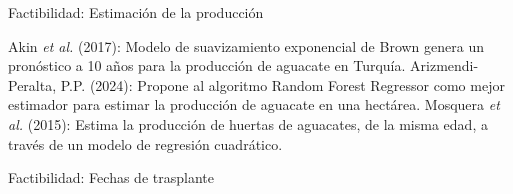 \documentclass[aspectratio=169]{beamer}
\begin{document}
\begin{frame}{Factibilidad: Estimación de la producción}
	\begin{block}{}
		Akin \textit{et al.} (2017): Modelo de suavizamiento exponencial de Brown genera un pronóstico a 10 años para la producción de aguacate en Turquía.
		Arizmendi-Peralta, P.P. (2024): Propone al algoritmo Random Forest Regressor como mejor estimador para estimar la producción de aguacate en una hectárea.
		Mosquera \textit{et al.} (2015): Estima la producción de huertas de aguacates, de la misma edad, a través de un modelo de regresión cuadrático.
	\end{block}
\end{frame}

\begin{frame}{Factibilidad: Fechas de trasplante}
	
\end{frame}
\end{document}
